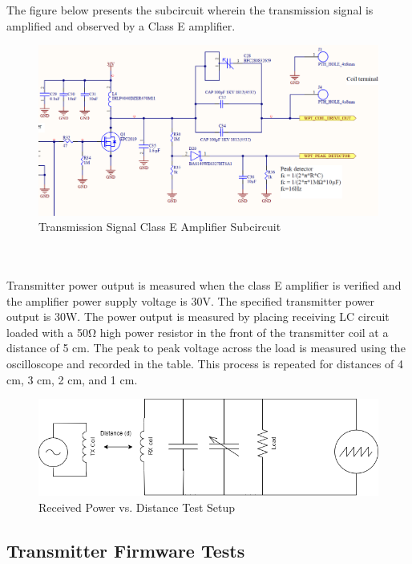 \documentclass[12pt]{article}
\begin{document}
\noindent
The figure below presents the subcircuit wherein the transmission signal is amplified and observed by a Class E amplifier.
\hfill
\begin{figure}[h!]
\centering
\includegraphics[width=0.9\linewidth]{Class_E_amplifier}
\caption{Transmission Signal Class E Amplifier Subcircuit}
\end{figure}
\hfill \\
\pagebreak
\hfill \\
\indent
Transmitter power output is measured when the class E amplifier is verified and the amplifier power supply voltage is 30V.  The specified transmitter power output is 30W. The power output is measured by placing receiving LC circuit loaded with a 50Ω high power resistor in the front of the transmitter coil at a distance of 5 cm. The peak to peak voltage across the load is measured using the oscilloscope and recorded in the table. This process is repeated for distances of 4 cm, 3 cm, 2 cm, and 1 cm.
\hfill
\begin{figure}[h!]
\centering
\includegraphics[width=0.75\linewidth]{Variable_RX-TX_Distance}
\caption{Received Power vs. Distance Test Setup}
\end{figure}

\subsection{Transmitter Firmware Tests}
\end{document}
